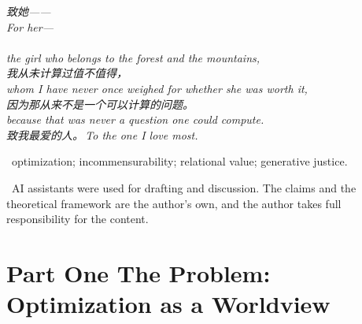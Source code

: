 
\thispagestyle{empty}
\null\vfill
\begin{center}
\begin{minipage}{0.74\linewidth}
\centering\itshape\color{rose}
{\cjk 致她——}\\[0.3em]
For her---\\[0.7em]
\\[0.2em]
the girl who belongs to the forest and the mountains,\\[0.5em]
{\cjk 我从未计算过值不值得，}\\[0.2em]
whom I have never once weighed for whether she was worth it,\\[0.2em]
{\cjk 因为那从来不是一个可以计算的问题。}\\[0.2em]
because that was never a question one could compute.\\[1.0em]
{\upshape\footnotesize\color{gold} {\cjk 致我最爱的人。}\,\;To the one I love most.}
\end{minipage}
\end{center}
\vfill\null
\clearpage



\vspace{1.2em}
\, \textcolor{inksoft}{optimization; incommensurability; relational value; generative justice.}

\vspace{1.0em}
\, \textcolor{inksoft}{AI assistants were used for drafting and discussion. The claims and the theoretical framework are the author's own, and the author takes full responsibility for the content.}
\newpage

\newpage

\part*{\textcolor{rosedeep}{Part One \quad The Problem: Optimization as a Worldview}}

